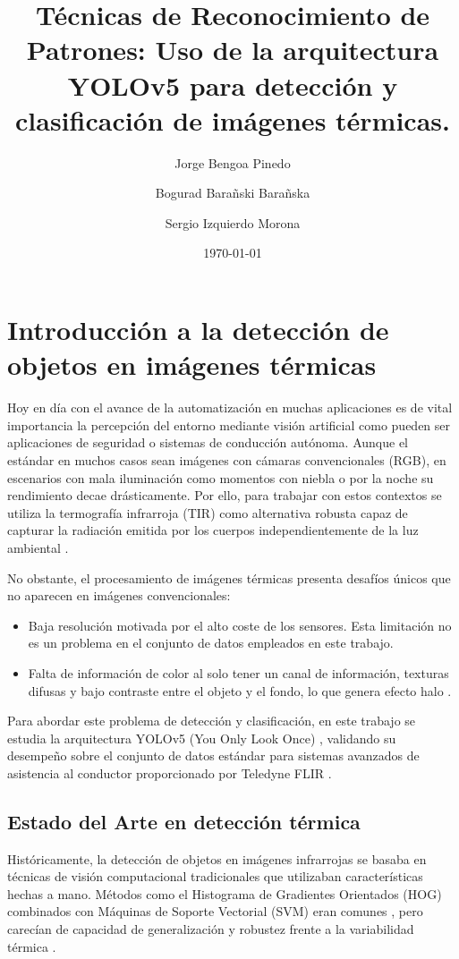 \documentclass{article}
\title{Técnicas de Reconocimiento de Patrones: Uso de la arquitectura YOLOv5 para detección y clasificación de imágenes térmicas.}
\author{Jorge Bengoa Pinedo \and Bogurad Barañski Barañska \and Sergio Izquierdo Morona }
\date{\today}
\begin{document}
	
	\maketitle
	
	\tableofcontents
	\newpage

	\section{Introducción a la detección de objetos en imágenes térmicas}
	Hoy en día con el avance de la automatización en muchas aplicaciones es de vital importancia la percepción del entorno mediante visión artificial como pueden ser aplicaciones de seguridad o sistemas de conducción autónoma. Aunque el estándar en muchos casos sean imágenes con cámaras convencionales (RGB), en escenarios con mala iluminación como momentos con niebla o por la noche su rendimiento decae drásticamente. Por ello, para trabajar con estos contextos se utiliza la termografía infrarroja (TIR) como alternativa robusta capaz de capturar la radiación emitida por los cuerpos independientemente de la luz ambiental \cite{jiang2022object}.
	
	
	No obstante, el procesamiento de imágenes térmicas presenta desafíos únicos que no aparecen en imágenes convencionales:
	\begin{itemize}
		\item 	Baja resolución motivada por el alto coste de los sensores. Esta limitación no es un problema en el conjunto de datos empleados en este trabajo.
		\item Falta de información de color al solo tener un canal de información, texturas difusas y bajo contraste entre el objeto y el fondo, lo que genera efecto halo \cite{jiang2022object}.
	\end{itemize}
	
	Para abordar este problema de detección y clasificación, en este trabajo se estudia la arquitectura YOLOv5 (You Only Look Once) \cite{yolov5}, validando su desempeño sobre el conjunto de datos estándar para sistemas avanzados de asistencia al conductor proporcionado por Teledyne FLIR \cite{flir2022}.
	
	\subsection{Estado del Arte en detección térmica}
	Históricamente, la detección de objetos en imágenes infrarrojas se basaba en técnicas de visión computacional tradicionales que utilizaban características hechas a mano. Métodos como el Histograma de Gradientes Orientados (HOG) combinados con Máquinas de Soporte Vectorial (SVM) eran comunes \cite{Munian31122022} \cite{Qian_2021}, pero carecían de capacidad de generalización y robustez frente a la variabilidad térmica \cite{jiang2022object}.
	
\end{document}
